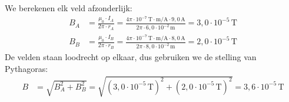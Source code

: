 \documentclass{ximera}
\begin{document}
\begin{exercise}
\begin{solution}
        \begin{center}
        \end{center}

        We berekenen elk veld afzonderlijk:
        \begin{align*}
            B_A &= \frac{\mu_0 \cdot I_A}{2\pi \cdot r_A} = \frac{4\pi \cdot 10^{-7}\,\mathrm{T\cdot m/A} \cdot 9{,}0\,\mathrm{A}}{2\pi \cdot 6{,}0 \cdot 10^{-2}\,\mathrm{m}} = 3{,}0 \cdot 10^{-5}\,\mathrm{T} \\
            B_B &= \frac{\mu_0 \cdot I_B}{2\pi \cdot r_B} = \frac{4\pi \cdot 10^{-7}\,\mathrm{T\cdot m/A} \cdot 8{,}0\,\mathrm{A}}{2\pi \cdot 8{,}0 \cdot 10^{-2}\,\mathrm{m}} = 2{,}0 \cdot 10^{-5}\,\mathrm{T}
        \end{align*}
        De velden staan loodrecht op elkaar, dus gebruiken we de stelling van Pythagoras:
        \begin{align*}
            B &= \sqrt{B_A^2 + B_B^2} = \sqrt{(3{,}0 \cdot 10^{-5}\,\mathrm{T})^2 + (2{,}0 \cdot 10^{-5}\,\mathrm{T})^2} = \boxed{3{,}6 \cdot 10^{-5}\,\mathrm{T}}
        \end{align*}
    \end{solution}
\end{exercise}
\end{document}
